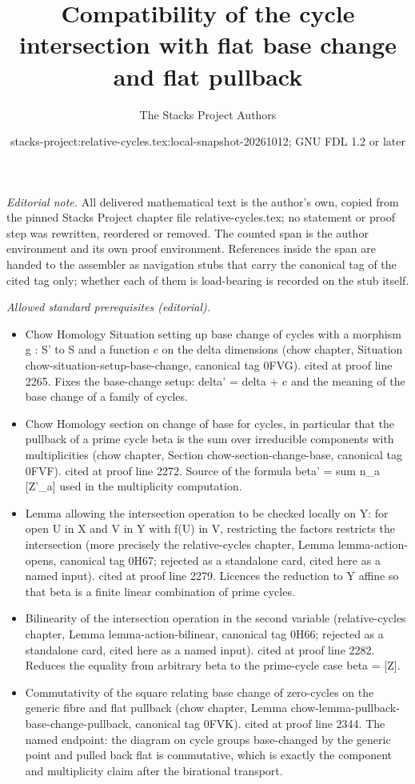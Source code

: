 \documentclass{stacks-project}
\title{Compatibility of the cycle intersection with flat base change and flat pullback}
\author{The Stacks Project Authors}
\date{stacks-project:relative-cycles.tex:local-snapshot-20261012; GNU FDL 1.2 or later}
\theoremstyle{plain}
\theoremstyle{definition}
\theoremstyle{remark}
\numberwithin{equation}{subsection}
\begin{document}
\maketitle
\setcounter{subsection}{1}
\noindent\textit{Editorial note.} All delivered mathematical text is the author's own, copied from the pinned Stacks Project chapter file relative-cycles.tex; no statement or proof step was rewritten, reordered or removed. The counted span is the author environment and its own proof environment. References inside the span are handed to the assembler as navigation stubs that carry the canonical tag of the cited tag only; whether each of them is load-bearing is recorded on the stub itself.\par\medskip
\noindent\textit{Allowed standard prerequisites (editorial).}\begin{itemize}
\item Chow Homology Situation setting up base change of cycles with a morphism g : S' to S and a function c on the delta dimensions (chow chapter, Situation chow-situation-setup-base-change, canonical tag 0FVG). cited at proof line 2265. Fixes the base-change setup: delta' = delta + c and the meaning of the base change of a family of cycles.
\item Chow Homology section on change of base for cycles, in particular that the pullback of a prime cycle beta is the sum over irreducible components with multiplicities (chow chapter, Section chow-section-change-base, canonical tag 0FVF). cited at proof line 2272. Source of the formula beta' = sum n\_a [Z'\_a] used in the multiplicity computation.
\item Lemma allowing the intersection operation to be checked locally on Y: for open U in X and V in Y with f(U) in V, restricting the factors restricts the intersection (more precisely the relative-cycles chapter, Lemma lemma-action-opens, canonical tag 0H67; rejected as a standalone card, cited here as a named input). cited at proof line 2279. Licences the reduction to Y affine so that beta is a finite linear combination of prime cycles.
\item Bilinearity of the intersection operation in the second variable (relative-cycles chapter, Lemma lemma-action-bilinear, canonical tag 0H66; rejected as a standalone card, cited here as a named input). cited at proof line 2282. Reduces the equality from arbitrary beta to the prime-cycle case beta = [Z].
\item Commutativity of the square relating base change of zero-cycles on the generic fibre and flat pullback (chow chapter, Lemma chow-lemma-pullback-base-change-pullback, canonical tag 0FVK). cited at proof line 2344. The named endpoint: the diagram on cycle groups base-changed by the generic point and pulled back flat is commutative, which is exactly the component and multiplicity claim after the birational transport.
\end{itemize}\medskip
\end{document}
